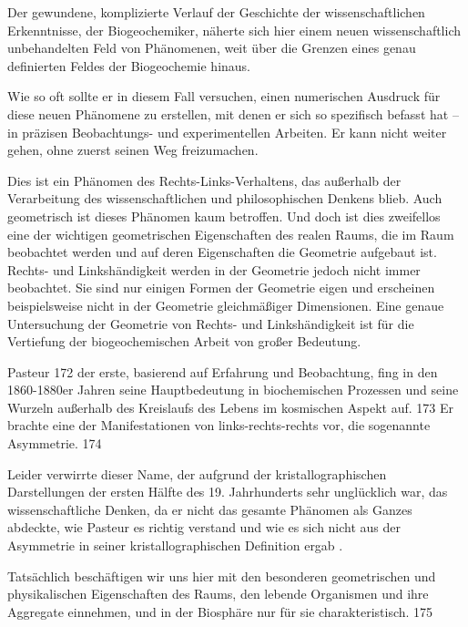 \documentclass[11pt,a4paper]{book}
\begin{document}
Der gewundene, komplizierte Verlauf der Geschichte der wissenschaftlichen Erkenntnisse, der Biogeochemiker, näherte sich hier einem neuen wissenschaftlich unbehandelten Feld von Phänomenen, weit über die Grenzen eines genau definierten Feldes der Biogeochemie hinaus.



Wie so oft sollte er in diesem Fall versuchen, einen numerischen Ausdruck für diese neuen Phänomene zu erstellen, mit denen er sich so spezifisch befasst hat -- in präzisen Beobachtungs- und experimentellen Arbeiten. Er kann nicht weiter gehen, ohne zuerst seinen Weg freizumachen.



Dies ist ein Phänomen des Rechts-Links-Verhaltens, das außerhalb der Verarbeitung des wissenschaftlichen und philosophischen Denkens blieb. Auch geometrisch ist dieses Phänomen kaum betroffen. Und doch ist dies zweifellos eine der wichtigen geometrischen Eigenschaften des realen Raums, die im Raum beobachtet werden und auf deren Eigenschaften die Geometrie aufgebaut ist. Rechts- und Linkshändigkeit werden in der Geometrie jedoch nicht immer beobachtet. Sie sind nur einigen Formen der Geometrie eigen und erscheinen beispielsweise nicht in der Geometrie gleichmäßiger Dimensionen. Eine genaue Untersuchung der Geometrie von Rechts- und Linkshändigkeit ist für die Vertiefung der biogeochemischen Arbeit von großer Bedeutung.



Pasteur 172 der erste, basierend auf Erfahrung und Beobachtung, fing in den 1860-1880er Jahren seine Hauptbedeutung in biochemischen Prozessen und seine Wurzeln außerhalb des Kreislaufs des Lebens im kosmischen Aspekt auf. 173 Er brachte eine der Manifestationen von links-rechts-rechts vor, die sogenannte Asymmetrie. 174



Leider verwirrte dieser Name, der aufgrund der kristallographischen Darstellungen der ersten Hälfte des 19. Jahrhunderts sehr unglücklich war, das wissenschaftliche Denken, da er nicht das gesamte Phänomen als Ganzes abdeckte, wie Pasteur es richtig verstand und wie es sich nicht aus der Asymmetrie in seiner kristallographischen Definition ergab .



Tatsächlich beschäftigen wir uns hier mit den besonderen geometrischen und physikalischen Eigenschaften des Raums, den lebende Organismen und ihre Aggregate einnehmen, und in der Biosphäre nur für sie charakteristisch. 175
\end{document}
